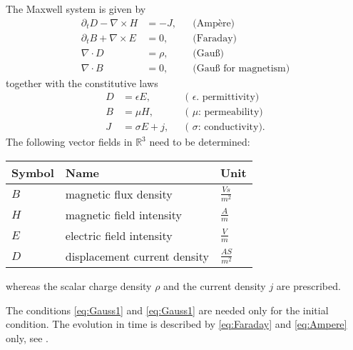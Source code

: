 \documentclass[a4paper,12pt]{article}
\theoremstyle{definition}
\theoremstyle{definition}
\begin{document}
The Maxwell system is given by
\begin{subequations}
	\begin{align}
	\partial_t D - \nabla\times H &= -J, &&\text{(Ampère)} \label{eq:Ampere}\\
	\partial_t B + \nabla\times E &= 0, &&\text{(Faraday)} \label{eq:Faraday}\\
	\nabla\cdot D &= \rho, &&\text{(Gauß)} \label{eq:Gauss1}\\
	\nabla\cdot B &=0, &&\text{(Gauß for magnetism)} \label{eq:Gauss2}
	\end{align}
\end{subequations}
together with the constitutive laws
\begin{subequations}
	\begin{align}
	D &= \epsilon E, &&\text{( $\epsilon$. permittivity)}\\
	B &= \mu H, &&\text{( $\mu$: permeability)}\\
	J &= \sigma E + j, &&\text{( $\sigma$: conductivity)} .
	\end{align}
\end{subequations}
The following vector fields in $\mathbb{R}^3$ need to be determined:
\begin{center}
	\begin{tabular}{lll}
		Symbol & Name & Unit\\
		\hline
		$B$ & magnetic flux density & $\frac{Vs}{m^2}$\\
		$H$ & magnetic field intensity & $\frac{A}{m}$\\
		$E$ & electric field intensity & $\frac{V}{m}$\\
		$D$ & displacement current density & $\frac{AS}{m^2}$\\
		\hline
	\end{tabular}
\end{center}
whereas the scalar charge density $\rho$ and the current density $j$ are prescribed.

The conditions \eqref{eq:Gauss1} and \eqref{eq:Gauss1} are needed only for the
initial condition. The evolution in time is described by \eqref{eq:Faraday} and
\eqref{eq:Ampere} only, see \cite{JinBook}.
\end{document}
